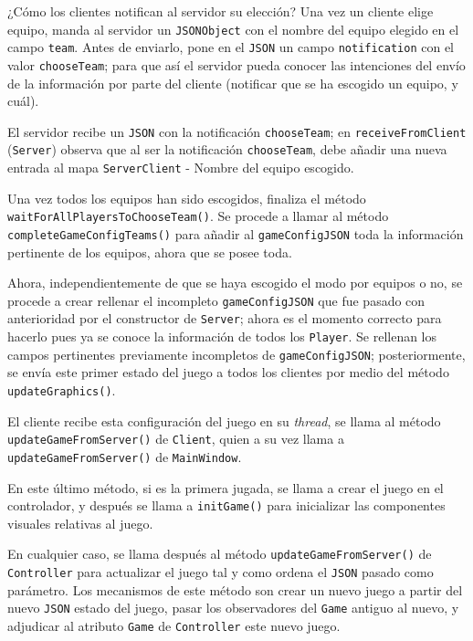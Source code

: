 \documentclass[../DocumentoOficial.tex]{subfiles}
\begin{document}
¿Cómo los clientes notifican al servidor su elección? Una vez un cliente elige equipo, manda al servidor un \texttt{JSONObject} con el nombre del equipo elegido en el campo \texttt{team}. Antes de enviarlo, pone en el \texttt{JSON} un campo \texttt{notification} con el valor \texttt{chooseTeam}; para que así el servidor pueda conocer las intenciones del envío de la información por parte del cliente (notificar que se ha escogido un equipo, y cuál).

El servidor recibe un \texttt{JSON} con la notificación \texttt{chooseTeam}; en \texttt{receiveFromClient} (\texttt{Server}) observa que al ser la notificación \texttt{chooseTeam}, debe añadir una nueva entrada al mapa \texttt{ServerClient} - Nombre del equipo escogido.

Una vez todos los equipos han sido escogidos, finaliza el método \texttt{waitForAllPlayersToChooseTeam()}. Se procede a llamar al método \texttt{completeGameConfigTeams()} para añadir al \texttt{gameConfigJSON} toda la información pertinente de los equipos, ahora que se posee toda.



Ahora, independientemente de que se haya escogido el modo por equipos o no, se procede a crear rellenar el incompleto \texttt{gameConfigJSON} que fue pasado con anterioridad por el constructor de \texttt{Server}; ahora es el momento correcto para hacerlo pues ya se conoce la información de todos los \texttt{Player}. Se rellenan los campos pertinentes previamente incompletos de \texttt{gameConfigJSON}; posteriormente, se envía este primer estado del juego a todos los clientes por medio del método \texttt{updateGraphics()}. 

El cliente recibe esta configuración del juego en su \textit{thread}, se llama al método \texttt{updateGameFromServer()} de \texttt{Client}, quien a su vez llama a \texttt{updateGameFromServer()} de \texttt{MainWindow}.

En este último método, si es la primera jugada, se llama a crear el juego en el controlador, y después se llama a \texttt{initGame()} para inicializar las componentes visuales relativas al juego.

En cualquier caso, se llama después al método \texttt{updateGameFromServer()} de \texttt{Controller} para actualizar el juego tal y como ordena el \texttt{JSON} pasado como parámetro. Los mecanismos de este método son crear un nuevo juego a partir del nuevo \texttt{JSON} estado del juego, pasar los observadores del \texttt{Game} antiguo al nuevo, y adjudicar al atributo \texttt{Game} de \texttt{Controller} este nuevo juego.
\end{document}
